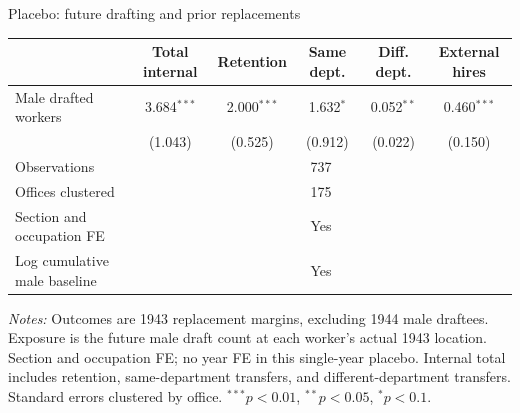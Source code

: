 \begin{frame}[t]{Placebo: future drafting and prior replacements}
\tiny\centering
\begin{threeparttable}
\begin{tabular}{lccccc}
\toprule
 & Total internal & Retention & Same dept. & Diff. dept. & External hires \\
\midrule
Male drafted workers & 3.684$^{***}$ & 2.000$^{***}$ & 1.632$^{*}$ & 0.052$^{**}$ & 0.460$^{***}$ \\
 & (1.043) & (0.525) & (0.912) & (0.022) & (0.150) \\
\midrule
Observations & \multicolumn{5}{c}{737} \\
Offices clustered & \multicolumn{5}{c}{175} \\
Section and occupation FE & \multicolumn{5}{c}{Yes} \\
Log cumulative male baseline & \multicolumn{5}{c}{Yes} \\
\bottomrule
\end{tabular}
\begin{tablenotes}[flushleft]
\tiny\item \textit{Notes:} Outcomes are 1943 replacement margins, excluding 1944 male draftees. Exposure is the future male draft count at each worker's actual 1943 location. Section and occupation FE; no year FE in this single-year placebo. Internal total includes retention, same-department transfers, and different-department transfers. Standard errors clustered by office. $^{***}p<0.01$, $^{**}p<0.05$, $^{*}p<0.1$.
\end{tablenotes}
\end{threeparttable}
\vspace{2mm}
\end{frame}
